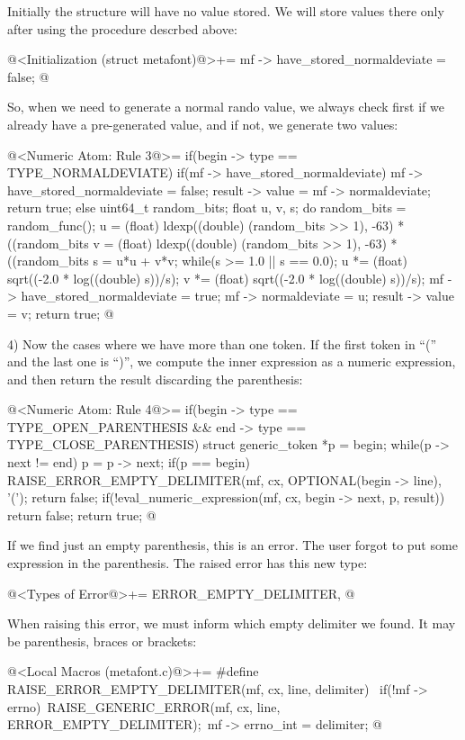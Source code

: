 Initially the structure will have no value stored. We will store
values there only after using the procedure descrbed above:

\iniciocodigo
@<Initialization (struct metafont)@>+=
mf -> have_stored_normaldeviate = false;
@
\fimcodigo

So, when we need to generate a normal rando value, we always check
first if we already have a pre-generated value, and if not, we
generate two values:

\iniciocodigo
@<Numeric Atom: Rule 3@>=
if(begin -> type == TYPE_NORMALDEVIATE){
  if(mf -> have_stored_normaldeviate){
    mf -> have_stored_normaldeviate = false;
    result -> value = mf -> normaldeviate;
    return true;
  }
  else{
    uint64_t random_bits;
    float u, v, s;
    do{
      random_bits = random_func();
      u = (float) ldexp((double) (random_bits >> 1), -63) *
            ((random_bits %
      v = (float) ldexp((double) (random_bits >> 1), -63) *
            ((random_bits %
      s = u*u + v*v;
    } while(s >= 1.0 || s == 0.0);
    u *= (float) sqrt((-2.0 * log((double) s))/s);
    v *= (float) sqrt((-2.0 * log((double) s))/s);
    mf -> have_stored_normaldeviate = true;
    mf -> normaldeviate = u;
    result -> value = v;
    return true;
  }
}
@
\fimcodigo

4) Now the cases where we have more than one token. If the first token
in ``('' and the last one is ``)'', we compute the inner expression as
a numeric expression, and then return the result discarding the
parenthesis:

\iniciocodigo
@<Numeric Atom: Rule 4@>=
if(begin -> type == TYPE_OPEN_PARENTHESIS &&
   end -> type == TYPE_CLOSE_PARENTHESIS){
   struct generic_token *p = begin;
   while(p -> next != end)
     p = p -> next;
   if(p == begin){
     RAISE_ERROR_EMPTY_DELIMITER(mf, cx, OPTIONAL(begin -> line), '(');
     return false;
   }
   if(!eval_numeric_expression(mf, cx, begin -> next, p, result))
     return false;
   return true;
}
@
\fimcodigo

If we find just an empty parenthesis, this is an error. The user
forgot to put some expression in the parenthesis. The raised error has
this new type:

\iniciocodigo
@<Types of Error@>+=
ERROR_EMPTY_DELIMITER,
@
\fimcodigo

When raising this error, we must inform which empty delimiter we
found. It may be parenthesis, braces or brackets:

\iniciocodigo
@<Local Macros (metafont.c)@>+=
#define RAISE_ERROR_EMPTY_DELIMITER(mf, cx, line, delimiter) {\
  if(!mf -> errno){\
    RAISE_GENERIC_ERROR(mf, cx, line, ERROR_EMPTY_DELIMITER);\
    mf -> errno_int = delimiter;}}
@
\fimcodigo

